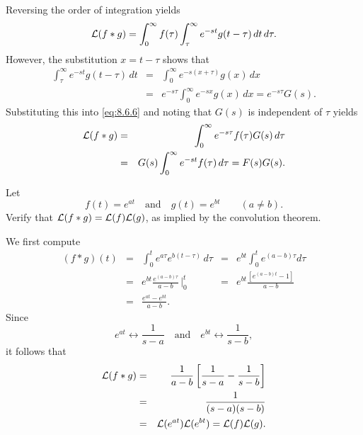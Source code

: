 \documentclass{ximera}
\begin{document}
Reversing the order of integration yields
\begin{equation}\label{eq:8.6.6}
{\cal L}(f\ast g)=\int_0^\infty f(\tau)\int^\infty_\tau e^{-st}g(t-\tau)\,
dt
\,d\tau.
\end{equation}
However, the substitution $x=t-\tau$ shows that
\begin{eqnarray*}
\int^\infty_\tau e^{-st}g(t-\tau)\,dt&=&\int_0^\infty
e^{-s(x+\tau)}g(x)\,dx\\
&=&e^{-s\tau}\int_0^\infty e^{-sx}g(x)\,dx=e^{-s\tau}G(s).
\end{eqnarray*}
Substituting this into  \eqref{eq:8.6.6} and noting that $G(s)$ is
independent of $\tau$ yields
\begin{eqnarray*}
{\cal L}(f\ast g)&=&\int_0^\infty e^{-s\tau} f(\tau)G(s)\,d\tau\\
&=&G(s)\int_0^\infty e^{-st}f(\tau)\,d\tau=F(s)G(s).
\end{eqnarray*}


\begin{example}\label{example:8.6.1}
 Let
$$
f(t)=e^{at}\quad\mbox{and}\quad  g(t)=e^{bt}\qquad (a\ne b).
$$
Verify that ${\cal L}(f\ast g)={\cal L}(f){\cal L}(g)$, as
implied by the convolution theorem.
\begin{explanation}
We first compute
$$
\begin{array}{ccccc}
(f\ast g)(t)&=&\int_0^t e^{a\tau}e^{b(t-\tau)}\,d\tau
&=&e^{bt}\int_0^t e^{(a-b)\tau} d\tau\\
&=&e^{bt} \frac{e^{(a-b)\tau}}{ a-b}\,\bigg|^t_0&=&
e^{bt}\frac{\left[e^{(a-b)t}-1\right]}{a-b}\\
&=&\frac{e^{at}-e^{bt}}{a-b}.
\end{array}
$$
Since
$$
e^{at}\leftrightarrow \frac{1}{s-a}\quad\mbox{and}\quad
e^{bt}\leftrightarrow \frac{1}{s-b},
$$
it follows that
\begin{eqnarray*}
{\cal L}(f\ast g)&=&\frac{1}{a-b}\left[\frac{1}{s-a}-\frac{1}{s-b}\right]\\
&=&\frac{1}{(s-a)(s-b)}\\
&=&{\cal L}(e^{at}){\cal L}(e^{bt})={\cal L}(f){\cal L}(g).
\end{eqnarray*}
\end{explanation}
\end{example}
\end{document}
